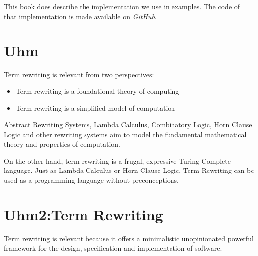\documentclass[11pt,twoside]{memoir}
\def\E{\emph} %
\begin{document}
This book does describe the implementation we use in examples. The code of that implementation is made available on \E{GitHub}.







\section*{Uhm}
Term rewriting is relevant from two perspectives:

\begin{itemize}
\item Term rewriting is a foundational theory of computing 
\item Term rewriting is a simplified model of computation 
\end{itemize}

Abstract Rewriting Systems, Lambda Calculus, Combinatory Logic, Horn Clause Logic and other rewriting systems aim to model the fundamental mathematical theory and properties of computation. 

On the other hand, term rewriting is a frugal, expressive Turing Complete language. Just as Lambda Calculus or Horn Clause Logic, Term Rewriting can be used as a programming language without  preconceptions. 

\section*{Uhm2:Term Rewriting}
Term rewriting is relevant because it offers a minimalistic unopinionated powerful framework for the design, specification and implementation of software. 
\end{document}
